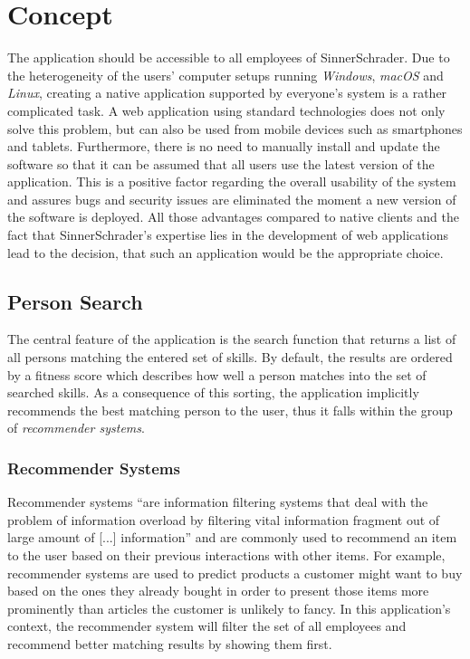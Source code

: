 \chapter{Concept}
The application should be accessible to all employees of SinnerSchrader. Due to the heterogeneity of the users' computer setups running \textit{Windows}, \textit{macOS} and \textit{Linux}, creating a native application supported by everyone’s system is a rather complicated task. A web application using standard technologies does not only solve this problem, but can also be used from mobile devices such as smartphones and tablets. Furthermore, there is no need to manually install and update the software so that it can be assumed that all users use the latest version of the application. This is a positive factor regarding the overall usability of the system and assures bugs and security issues are eliminated the moment a new version of the software is deployed. All those advantages compared to native clients and the fact that SinnerSchrader’s expertise lies in the development of web applications lead to the decision, that such an application would be the appropriate choice.

\section{Person Search}
The central feature of the application is the search function that returns a list of all persons matching the entered set of skills. By default, the results are ordered by a fitness score which describes how well a person matches into the set of searched skills. As a consequence of this sorting, the application implicitly recommends the best matching person to the user, thus it falls within the group of \textit{recommender systems}.

\subsection{Recommender Systems}
Recommender systems ``are information filtering systems that deal with the problem of information overload by filtering vital information fragment out of large amount of [...] information'' \cite{Isinkaye2015261}\label{recommender-definition} and are commonly used to recommend an item to the user based on their previous interactions with other items. For example, recommender systems are used to predict products a customer might want to buy based on the ones they already bought in order to present those items more prominently than articles the customer is unlikely to fancy. In this application's context, the recommender system will filter the set of all employees and recommend better matching results by showing them first.

